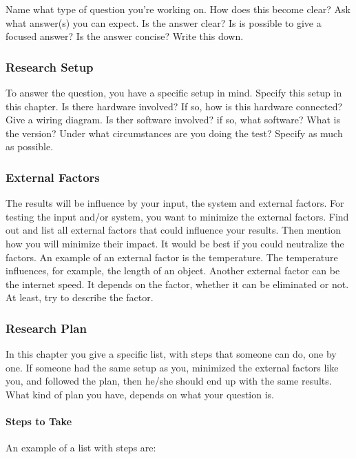 \documentclass[10pt]{report}
\begin{document}
\noindent Name what type of question you're working on. How does this become clear? Ask what answer(s) you can expect. Is the answer clear? Is is possible to give a focused answer? Is the answer concise? Write this down.

\subsubsection{Research Setup}

To answer the question, you have a specific setup in mind. Specify this setup in this chapter. Is there hardware involved? If so, how is this hardware connected? Give a wiring diagram. Is ther software involved? if so, what software? What is the version? Under what circumstances are you doing the test? Specify as much as possible.

\subsubsection{External Factors}

The results will be influence by your input, the system and external factors. For testing the input and/or system, you want to minimize the external factors. Find out and list all external factors that could influence your results. Then mention how you will minimize their impact. It would be best if you could neutralize the factors. An example of an external factor is the temperature. The temperature influences, for example, the length of an object. Another external factor can be the internet speed. It depends on the factor, whether it can be eliminated or not. At least, try to describe the factor.

\subsubsection{Research Plan}

In this chapter you give a specific list, with steps that someone can do, one by one. If someone had the same setup as you, minimized the external factors like you, and followed the plan, then he/she should end up with the same results. What kind of plan you have, depends on what your question is. 

\paragraph{Steps to Take}

An example of a list with steps are:
\end{document}
